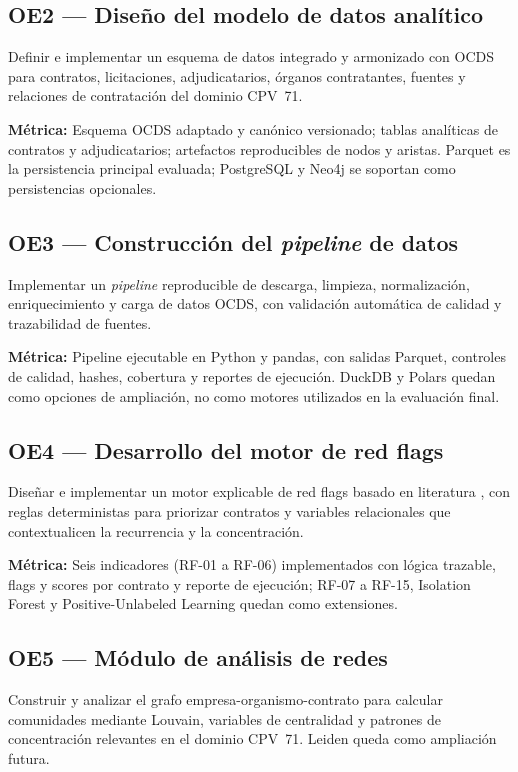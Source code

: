 \documentclass[11pt,a4paper,spanish]{book}
\numberwithin{equation}{chapter}
\numberwithin{figure}{chapter}
\begin{document}
\subsection*{OE2 --- Dise{\~n}o del modelo de datos anal{\'i}tico}
Definir e implementar un esquema de datos integrado y armonizado con OCDS para contratos, licitaciones, adjudicatarios, {\'o}rganos contratantes, fuentes y relaciones de contrataci{\'o}n del dominio CPV~71.

\textbf{M{\'e}trica:} Esquema OCDS adaptado y can{\'o}nico versionado; tablas anal{\'i}ticas de contratos y adjudicatarios; artefactos reproducibles de nodos y aristas. Parquet es la persistencia principal evaluada; PostgreSQL y Neo4j se soportan como persistencias opcionales.

\subsection*{OE3 --- Construcci{\'o}n del \textit{pipeline} de datos}
Implementar un \textit{pipeline} reproducible de descarga, limpieza, normalizaci{\'o}n, enriquecimiento y carga de datos OCDS, con validaci{\'o}n autom{\'a}tica de calidad y trazabilidad de fuentes.

\textbf{M{\'e}trica:} Pipeline ejecutable en Python y pandas, con salidas Parquet, controles de calidad, hashes, cobertura y reportes de ejecuci{\'o}n. DuckDB y Polars quedan como opciones de ampliaci{\'o}n, no como motores utilizados en la evaluaci{\'o}n final.

\subsection*{OE4 --- Desarrollo del motor de red flags}
Dise{\~n}ar e implementar un motor explicable de red flags basado en literatura \cite{OCP2024RedFlags,Fazekas2020DIGIWHIST}, con reglas deterministas para priorizar contratos y variables relacionales que contextualicen la recurrencia y la concentraci{\'o}n.

\textbf{M{\'e}trica:} Seis indicadores (RF-01 a RF-06) implementados con l{\'o}gica trazable, flags y scores por contrato y reporte de ejecuci{\'o}n; RF-07 a RF-15, Isolation Forest y Positive-Unlabeled Learning quedan como extensiones.

\subsection*{OE5 --- M{\'o}dulo de an{\'a}lisis de redes}
Construir y analizar el grafo empresa-organismo-contrato para calcular comunidades mediante Louvain, variables de centralidad y patrones de concentraci{\'o}n relevantes en el dominio CPV~71. Leiden queda como ampliaci{\'o}n futura.
\end{document}

